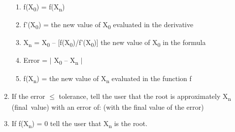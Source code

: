 \documentclass[12pt]{article}
\renewcommand{\_}{\kern-1.5pt\textunderscore\kern-1.5pt}
\begin{document}
\begin{enumerate}
\begin{enumerate}
	\item f(X\textsubscript{0}) = f(X\textsubscript{n})\par

	\item f’(X\textsubscript{0}) = the new value of X\textsubscript{0 }evaluated in the derivative \par

	\item X\textsubscript{n }= X\textsubscript{0 }– [f(X\textsubscript{0})/f’(X\textsubscript{0})] the new value of X\textsubscript{0} in the formula\par

	\item Error = $ \vert $  X\textsubscript{0} – X\textsubscript{n  }$ \vert $ \par

	\item f(X\textsubscript{n}) = the new value of X\textsubscript{n }evaluated in the function f\par


\end{enumerate}
	\item If the error $ \leq $  tolerance, tell the user that the root is approximately X\textsubscript{n }(final\ value) with an error of: \_\_\_\_ (with the final value of the error)\par

	\item If f(X\textsubscript{n}) = 0 tell the user that X\textsubscript{n }is the root. 
\end{enumerate}\par


\vspace{\baselineskip}

\printbibliography
\end{document}
